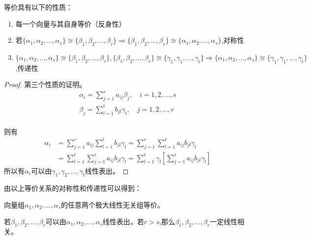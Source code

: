 \documentclass[blue,normal,cn]{elegantnote}
\begin{document}
\begin{property}
    等价具有以下的性质：
    \begin{enumerate}
            \item 每一个向量与其自身等价（反身性）
            \item 若$ \{α_1,α_2,...,α_s\} \cong \{β_1,β_2,...,β_r\} \Rightarrow \{β_1,β_2,...,β_r\} \cong \{α_1,α_2,...,α_s\}$,对称性
            \item  $\{α_1,α_2,...,α_s\} \cong \{β_1,β_2,...,β_r\},\{β_1,β_2,...,β_r\} \cong \{γ_1,γ_1,...,γ_t\} \Rightarrow  \{α_1,α_2,...,α_s\} \cong \{γ_1,γ_1,...,γ_t\}$,传递性
    \end{enumerate}
\end{property}
\begin{proof}
第三个性质的证明。
    $$
        \begin{aligned}
            α_i=\sum_{j=1}^{r}a_{ij}β_{j},\quad i=1,2,...,s\\
            β_j=\sum_{l=1}^{t}b_{jl}γ_{l},\quad j=1,2,...,r\\
        \end{aligned}
    $$

    则有
    $$
        \begin{aligned}
            α_i&=\sum_{j=1}^{r}a_{ij}\sum_{l=1}^{t}b_{jl}γ_{l}=\sum_{j=1}^{r}\sum_{l=1}^{t}a_{ij}b_{jl}γ_{l}\\
            &=\sum_{l=1}^{t}\sum_{j=1}^{r}a_{ij}b_{jl}γ_{l}=\sum_{l=1}^{t}γ_{l}\left[\sum_{j=1}^{r}a_{ij}b_{jl}γ_{l}\right]
        \end{aligned}
    $$
    所以有$α_i$可以由$γ_1,γ_2,...,γ_t$线性表出。
\end{proof}
由以上等价关系的对称性和传递性可以得到：
\begin{proposition}
向量组$α_1,α_2,...,α_s$的任意两个极大线性无关组等价。
\end{proposition}

\begin{lemma}
若$β_1,β_2,...,β_r$可以由$α_1,α_2,...,α_s$线性表出，若$r>s$,那么$β_1,β_2,...,β_r$一定线性相关。
\end{lemma}
\end{document}
